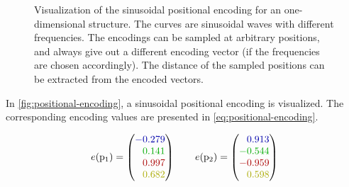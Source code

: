 \begin{figure}[htbp]
    \centering
    \vspace{0.1cm}
    \caption{Visualization of the sinusoidal positional encoding for an one-dimensional structure.
            The curves are sinusoidal waves with different frequencies. 
            The encodings can be sampled at arbitrary positions, and always give out a different encoding vector (if the frequencies are chosen accordingly).
            The distance of the sampled positions can be extracted from the encoded vectors.
    }
    \label{fig:positional-encoding}
\end{figure}

In \autoref{fig:positional-encoding}, a sinusoidal positional encoding is visualized. 
The corresponding encoding values are presented in \autoref{eq:positional-encoding}.

\begin{equation}
    \label{eq:positional-encoding}
    e(\mathrm{p}_1) = \left(\begin{matrix}
        \textcolor{textblue}{-0.279}\\
        \textcolor{textgreen}{\phantom{-}0.141}\\
        \textcolor{textred}{\phantom{-}0.997}\\
        \textcolor{textyellow}{\phantom{-}0.682}\\
    \end{matrix}\right)\qquad
    e(\mathrm{p}_2) = \left(\begin{matrix}
        \textcolor{textblue}{\phantom{-}0.913}\\
        \textcolor{textgreen}{-0.544}\\
        \textcolor{textred}{-0.959}\\
        \textcolor{textyellow}{\phantom{-}0.598}\\
    \end{matrix}\right)
\end{equation}